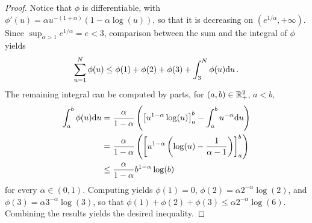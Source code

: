 \begin{proof}
    Notice that $\phi$ is differentiable, with $\phi'(u)=\alpha u^{-(1+\alpha)}(1-\alpha\log(u))$, so that it is decreasing on $(e^{1/\alpha},+\infty)$. Since $\sup_{\alpha>1}e^{1/\alpha}=e<3$, comparison between the sum and the integral of $\phi$ yields
    \[
        \sum_{u=1}^N\phi(u) \le \phi(1)+\phi(2)+\phi(3)+\int_3^N \phi(u)\mathrm{d} u\,.
    \]
    The remaining integral can be computed by parts, for $(a,b)\in\mathbb{R}_+^2$, $a<b$, 
    \begin{align*}
        \int_a^b\phi(u)\mathrm{d} u &= \frac{\alpha}{1-\alpha}\left({\left[u^{1-\alpha}\log(u)\right]}_a^b - \int_a^b u^{-{\alpha}}\mathrm{d} u\right)\\
        &=\frac{\alpha}{1-\alpha}\left({\left[u^{1-\alpha}\left(\log(u) -\frac{1}{\alpha-1}\right)\right]}_a^b\right)\\
        &\le \frac{\alpha}{1-\alpha}b^{1-\alpha}\log(b)
    \end{align*}
    for every $\alpha\in(0,1)$. Computing yields $\phi(1)=0$, $\phi(2)=\alpha 2^{-\alpha}\log(2)$, and $\phi(3)= \alpha 3^{-\alpha}\log(3)$, so that $\phi(1)+\phi(2)+\phi(3)\le \alpha 2^{-\alpha}\log(6)$.  Combining the results yields the desired inequality.
\end{proof}


